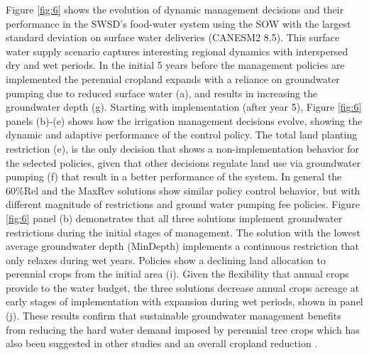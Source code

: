\documentclass[a4paper,fleqn]{cas-sc}
\begin{document}
Figure \ref{fig:6} shows the evolution of dynamic management decisions and their performance in the SWSD's food-water system using the SOW with the largest standard deviation on surface water deliveries 
(CANESM2 8.5). This surface water supply scenario captures interesting regional dynamics with interspersed dry and wet periods. In the initial 5 years before the management policies are implemented the perennial cropland expands with a reliance on groundwater pumping due to reduced surface water (a), and results in increasing the groundwater depth (g). Starting with implementation (after year 5), Figure \ref{fig:6} panels (b)-(e) shows how the irrigation management decisions evolve, showing the dynamic and adaptive performance of the control policy. The total land planting restriction (e), is the only decision that shows a non-implementation behavior for the selected policies, given that other decisions regulate land use via groundwater pumping (f) that result in a better performance of the system. In general the 60\%Rel and the MaxRev solutions show similar policy control behavior, but with different magnitude of restrictions and ground water pumping fee policies. Figure \ref{fig:6} panel (b) demonstrates that all three solutions implement groundwater restrictions during the initial stages of management. The solution with the lowest average groundwater depth (MinDepth) implements a continuous restriction that only relaxes during wet years. Policies show a declining land allocation to perennial crops from the initial area (i). Given the flexibility that annual crops provide to the water budget, the three solutions decrease annual crops acreage at early stages of implementation with expansion during wet periods, shown in panel (j). These results confirm that sustainable groundwater management benefits from reducing the hard water demand imposed by perennial tree crops which has also been suggested in other studies \citep{qin_flexibility_2019,mall_water_2019} and an overall cropland reduction \citep{hanak_water_2019}. 
\end{document}

